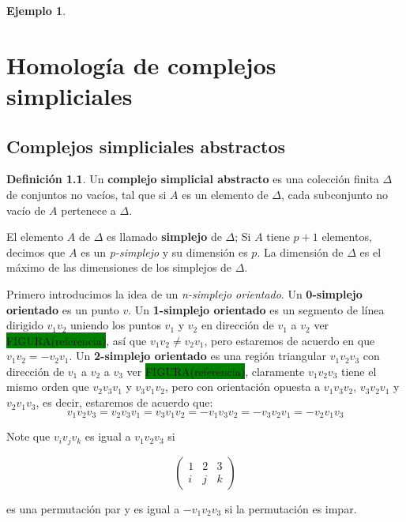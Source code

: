 \documentclass[12pt]{book}
\theoremstyle{definition}
\newtheorem{definition}[theorem]{Definición}
\newtheorem{example}[theorem]{Ejemplo}
\newcounter{in}
\newcounter{ini}
\begin{document}
{\begin{example}
\end{example}

\chapter{Homología de complejos simpliciales}

\section{Complejos simpliciales abstractos}

\begin{definition}
Un \textbf{complejo simplicial abstracto} es una colección finita
$\Delta$ de conjuntos no vacíos, tal que si $A$ es un elemento de $\Delta$,
cada subconjunto no vacío de $A$ pertenece a $\Delta$.
\end{definition}

El elemento $A$ de $\Delta$ es llamado \textbf{simplejo} de
$\Delta$; Si $A$ tiene $p+1$ elementos, decimos que $A$ es un
\emph{p-simplejo} y su dimensión es $p$. La dimensión de $\Delta$
es el máximo de las dimensiones de los simplejos de $\Delta$.

Primero introducimos la idea de un \emph{n-simplejo orientado}. Un
\textbf{0-simplejo orientado} es un punto $v$. Un \textbf{1-simplejo
  orientado} es un segmento de línea dirigido $v_{1}v_{2}$ uniendo los
puntos $v_{1}$ y $v_{2}$ en dirección de $v_{1}$ a $v_{2}$ ver \setlength{\fboxsep}{0pt}\colorbox{green}{FIGURA(referencia)}, así que
$v_{1}v_{2}\neq v_{2}v_{1}$, pero estaremos de acuerdo en que
$v_{1}v_{2}=-v_{2}v_{1}$. Un \textbf{2-simplejo orientado} es una
región triangular $v_{1}v_{2}v_{3}$ con dirección de $v_{1}$ a $v_{2}$
a $v_{3}$ ver \setlength{\fboxsep}{0pt}\colorbox{green}{FIGURA(referencia)}, claramente $v_{1}v_{2}v_{3}$ tiene el mismo orden que
$v_{2}v_{3}v_{1}$ y $v_{3}v_{1}v_{2}$, pero con orientación opuesta a
$v_{1}v_{3}v_{2}$, $v_{3}v_{2}v_{1}$ y $v_{2}v_{1}v_{3}$, es decir, estaremos de acuerdo que:
$$v_{1}v_{2}v_{3}=v_{2}v_{3}v_{1}=v_{3}v_{1}v_{2}=-v_{1}v_{3}v_{2}=-v_{3}v_{2}v_{1}=-v_{2}v_{1}v_{3}$$

Note que $v_{i}v_{j}v_{k}$ es igual a $v_{1}v_{2}v_{3}$ si

\[ \left(
  \begin{array}{ccc}
    1 & 2 & 3 \\
    i & j & k 
  \end{array} 
\right)\] 

es una permutación par y es igual a $-v_{1}v_{2}v_{3}$ si la
permutación es impar.

}
\end{document}

